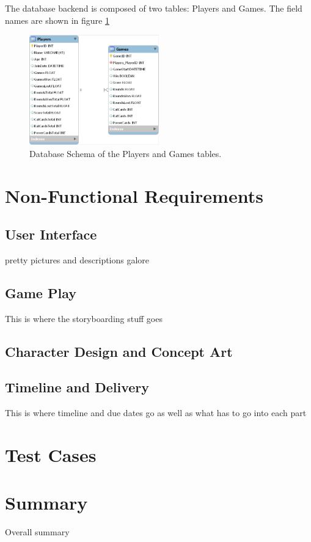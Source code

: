 \documentclass[12pt]{IEEEtran}
\begin{document}
	The database backend is composed of two tables: Players and Games. The field names are shown in figure \ref{fig:dbschema}
	
	\begin{figure}
		\includegraphics[width=0.5\textwidth]{DatabaseDiagram.png}
		\caption[Database table design]{ Database Schema of the Players and Games tables.}
		\label{fig:dbschema}
	\end{figure}

\section{Non-Functional Requirements}
\label{sec:nonFuncReq}

\subsection{User Interface}
\label{subsec:ui}

pretty pictures and descriptions galore

\subsection{Game Play}
\label{subsec:gameplay}

	This is where the storyboarding stuff goes

\subsection{Character Design and Concept Art}
\label{subsec:cdesign}

\subsection{Timeline and Delivery}
\label{subsec:timeline}

	This is where timeline and due dates go as well as what has to go into each part

\section{Test Cases}
\label{sec:test}

\section{Summary}
\label{sec:summary}

	Overall summary
\end{document}
